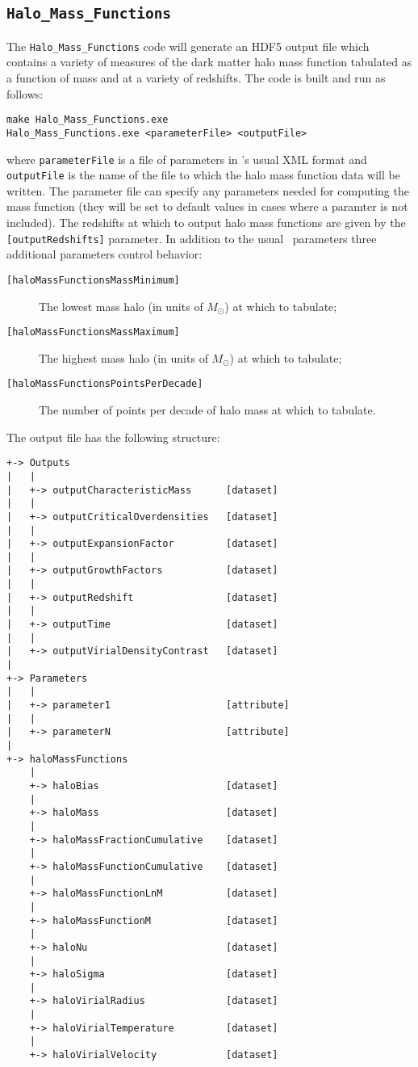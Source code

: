 \subsection{{\tt Halo\_Mass\_Functions}}

The {\tt Halo\_Mass\_Functions} code will generate an HDF5 output file which contains a variety of measures of the dark matter halo mass function tabulated as a function of mass and at a variety of redshifts. The code is built and run as follows:
\begin{verbatim}
make Halo_Mass_Functions.exe
Halo_Mass_Functions.exe <parameterFile> <outputFile>
\end{verbatim}
where {\tt parameterFile} is a file of parameters in \glc's usual XML format and {\tt outputFile} is the name of the file to which the halo mass function data will be written. The parameter file can specify any parameters needed for computing the mass function (they will be set to default values in cases where a paramter is not included). The redshifts at which to output halo mass functions are given by the {\tt [outputRedshifts]} parameter. In addition to the usual \glc\ parameters three additional parameters control behavior:
\begin{description}
\item [{\tt [haloMassFunctionsMassMinimum]}] The lowest mass halo (in units of $M_\odot$) at which to tabulate;
\item [{\tt [haloMassFunctionsMassMaximum]}] The highest mass halo (in units of $M_\odot$) at which to tabulate;
\item [{\tt [haloMassFunctionsPointsPerDecade]}] The number of points per decade of halo mass at which to tabulate.
\end{description}
The output file has the following structure:
\begin{verbatim}
+-> Outputs
|   |
|   +-> outputCharacteristicMass      [dataset]
|   |
|   +-> outputCriticalOverdensities   [dataset]
|   |
|   +-> outputExpansionFactor         [dataset]
|   |
|   +-> outputGrowthFactors           [dataset]
|   |
|   +-> outputRedshift                [dataset]
|   |
|   +-> outputTime                    [dataset]
|   |
|   +-> outputVirialDensityContrast   [dataset]
|    
+-> Parameters
|   |
|   +-> parameter1                    [attribute]
|   |
|   +-> parameterN                    [attribute]
|    
+-> haloMassFunctions
    |
    +-> haloBias                      [dataset]
    |
    +-> haloMass                      [dataset]
    |
    +-> haloMassFractionCumulative    [dataset]
    |
    +-> haloMassFunctionCumulative    [dataset]
    |
    +-> haloMassFunctionLnM           [dataset]
    |
    +-> haloMassFunctionM             [dataset]
    |
    +-> haloNu                        [dataset]
    |
    +-> haloSigma                     [dataset]
    |
    +-> haloVirialRadius              [dataset]
    |
    +-> haloVirialTemperature         [dataset]
    |
    +-> haloVirialVelocity            [dataset]
\end{verbatim}
